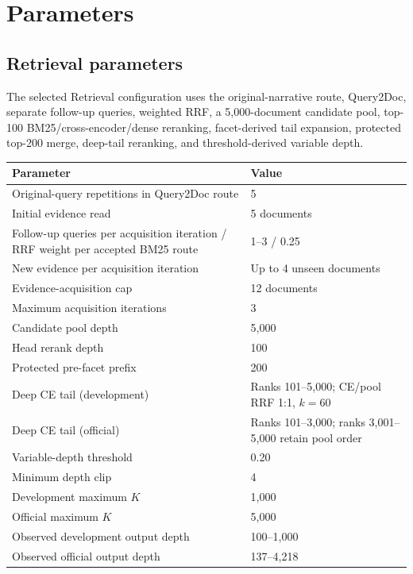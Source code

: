 \section{Parameters}
\label{app:parameters}
\captionsetup{hypcap=false,aboveskip=3pt,belowskip=3pt}
\setlength{\abovecaptionskip}{3pt}
\setlength{\belowcaptionskip}{3pt}
\setlength{\floatsep}{6pt plus 2pt minus 2pt}
\setlength{\textfloatsep}{8pt plus 2pt minus 2pt}
\setlength{\intextsep}{6pt plus 2pt minus 2pt}

\subsection{Retrieval parameters}

The selected Retrieval configuration uses the original-narrative route,
Query2Doc, separate follow-up queries, weighted RRF, a 5,000-document
candidate pool, top-100 BM25/cross-encoder/dense reranking,
facet-derived tail expansion, protected top-200 merge, deep-tail
reranking, and threshold-derived variable depth.

\begin{center}
\label{tab:appendix-retrieval-parameters}
\centering
\small
\setlength{\tabcolsep}{6pt}
\renewcommand{\arraystretch}{1.08}
\begin{tabularx}{\columnwidth}{@{}>{\raggedright\arraybackslash}p{}X@{}}
\toprule
Parameter & Value \\
\midrule
Original-query repetitions in Query2Doc route & 5 \\
Initial evidence read & 5 documents \\
Follow-up queries per acquisition iteration / RRF weight per accepted BM25 route & 1--3 / 0.25 \\
New evidence per acquisition iteration & Up to 4 unseen documents \\
Evidence-acquisition cap & 12 documents \\
Maximum acquisition iterations & 3 \\
Candidate pool depth & 5,000 \\
Head rerank depth & 100 \\
Protected pre-facet prefix & 200 \\
Deep CE tail (development) & Ranks 101--5,000; CE/pool RRF 1:1, $k=60$ \\
Deep CE tail (official) & Ranks 101--3,000; ranks 3,001--5,000 retain pool order \\
Variable-depth threshold & 0.20 \\
Minimum depth clip & 4 \\
Development maximum $K$ & 1,000 \\
Official maximum $K$ & 5,000 \\
Observed development output depth & 100--1,000 \\
Observed official output depth & 137--4,218 \\
\bottomrule
\end{tabularx}
\end{center}

